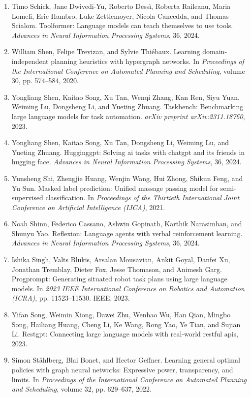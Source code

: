 \documentclass[11pt,UTF8,fontset=fandol]{ctexart}
\begin{document}
\begin{enumerate}[leftmargin=2em]
\item Timo Schick, Jane Dwivedi-Yu, Roberto Dess\`i, Roberta Raileanu, Maria Lomeli, Eric Hambro, Luke Zettlemoyer, Nicola Cancedda, and Thomas Scialom. Toolformer: Language models can teach themselves to use tools. \textit{Advances in Neural Information Processing Systems}, 36, 2024.
\item William Shen, Felipe Trevizan, and Sylvie Thi\'ebaux. Learning domain-independent planning heuristics with hypergraph networks. In \textit{Proceedings of the International Conference on Automated Planning and Scheduling}, volume 30, pp. 574--584, 2020.
\item Yongliang Shen, Kaitao Song, Xu Tan, Wenqi Zhang, Kan Ren, Siyu Yuan, Weiming Lu, Dongsheng Li, and Yueting Zhuang. Taskbench: Benchmarking large language models for task automation. \textit{arXiv preprint arXiv:2311.18760}, 2023.
\item Yongliang Shen, Kaitao Song, Xu Tan, Dongsheng Li, Weiming Lu, and Yueting Zhuang. Hugginggpt: Solving ai tasks with chatgpt and its friends in hugging face. \textit{Advances in Neural Information Processing Systems}, 36, 2024.
\item Yunsheng Shi, Zhengjie Huang, Wenjin Wang, Hui Zhong, Shikun Feng, and Yu Sun. Masked label prediction: Unified massage passing model for semi-supervised classification. In \textit{Proceedings of the Thirtieth International Joint Conference on Artificial Intelligence (IJCA)}, 2021.
\item Noah Shinn, Federico Cassano, Ashwin Gopinath, Karthik Narasimhan, and Shunyu Yao. Reflexion: Language agents with verbal reinforcement learning. \textit{Advances in Neural Information Processing Systems}, 36, 2024.
\item Ishika Singh, Valts Blukis, Arsalan Mousavian, Ankit Goyal, Danfei Xu, Jonathan Tremblay, Dieter Fox, Jesse Thomason, and Animesh Garg. Progprompt: Generating situated robot task plans using large language models. In \textit{2023 IEEE International Conference on Robotics and Automation (ICRA)}, pp. 11523--11530. IEEE, 2023.
\item Yifan Song, Weimin Xiong, Dawei Zhu, Wenhao Wu, Han Qian, Mingbo Song, Hailiang Huang, Cheng Li, Ke Wang, Rong Yao, Ye Tian, and Sujian Li. Restgpt: Connecting large language models with real-world restful apis, 2023.
\item Simon St\aa hlberg, Blai Bonet, and Hector Geffner. Learning general optimal policies with graph neural networks: Expressive power, transparency, and limits. In \textit{Proceedings of the International Conference on Automated Planning and Scheduling}, volume 32, pp. 629--637, 2022.

\end{enumerate}
\end{document}
